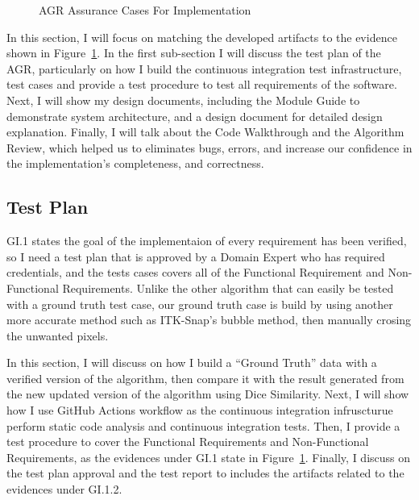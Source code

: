 \begin{figure}[hp]
    \centering
    \caption[AGR Assurance Cases For Implementation]{AGR Assurance Cases For Implementation}
    \label{fig_agr_ac_gi}
\end{figure}

In this section, I will focus on matching the developed artifacts to the evidence shown in Figure~\ref{fig_agr_ac_gi}. In the first sub-section I will discuss the test plan of the AGR, particularly on how I build the continuous integration test infrastructure, test cases and provide a test procedure to test all requirements of the software. Next, I will show my design documents, including the Module Guide to demonstrate system architecture, and a design document for detailed design explanation. Finally, I will talk about the Code Walkthrough and the Algorithm Review, which helped us to eliminates bugs, errors, and increase our confidence in the implementation's completeness, and correctness.

\subsection{Test Plan}

GI.1 states the goal of the implementaion of every requirement has been verified, so I need a test plan that is approved by a Domain Expert who has required credentials,  and the tests cases covers all of the Functional Requirement and Non-Functional Requirements. Unlike the other algorithm that can easily be tested with a ground truth test case, our ground truth case is build by using another more accurate method such as ITK-Snap's bubble method, then manually crosing the unwanted pixels.

In this section, I will discuss on how I build a ``Ground Truth'' data with a verified version of the algorithm, then compare it with the result generated from the new updated version of the algorithm using Dice Similarity. Next, I will show how I use GitHub Actions workflow as the continuous integration infruscturue perform static code analysis and continuous integration tests. Then, I provide a test procedure to cover the Functional Requirements and Non-Functional Requirements, as the evidences under GI.1 state in Figure~\ref{fig_agr_ac_gi}. Finally, I discuss on the test plan approval and the test report to includes the artifacts related to the evidences under GI.1.2.

